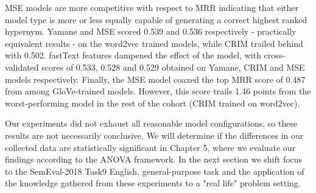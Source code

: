 \ac{MSE} models are more competitive with respect to \ac{MRR} indicating that either model type is more or less equally capable of generating a correct highest ranked hypernym.  Yamane and MSE scored 0.539 and 0.536 respectively - practically equivalent results - on the word2vec trained models, while CRIM trailed behind with 0.502.  fastText features dampened the effect of the model, with cross-validated scores of 0.533, 0.528 and 0.529 obtained on Yamane, CRIM and MSE models respectively.  Finally, the MSE model coaxed the top \ac{MRR} score of 0.487 from among GloVe-trained models.  However, this score trails 1.46 points from the worst-performing model in the rest of the cohort (CRIM trained on word2vec).

Our experiments did not exhaust all reasonable model configurations, so these results are not necessarily conclusive.  We will determine if the differences in our collected data are statistically significant in Chapter 5, where we evaluate our findings according to the \ac{ANOVA} framework.  In the next section we shift focus to the SemEval-2018 Task9 English, general-purpose task and the application of the knowledge gathered from these experiments to a "real life" problem setting.